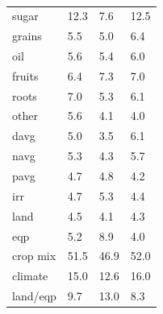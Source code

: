 \documentclass[11pt]{article}
\begin{document}
\begin{table}[h!]
{\begin{tabular}{llll}
sugar & 12.3 & 7.6 & 12.5 \\
grains & 5.5 & 5.0 & 6.4 \\
oil & 5.6 & 5.4 & 6.0 \\
fruits & 6.4 & 7.3 & 7.0 \\
roots & 7.0 & 5.3 & 6.1 \\
other & 5.6 & 4.1 & 4.0 \\
davg & 5.0 & 3.5 & 6.1 \\
navg & 5.3 & 4.3 & 5.7 \\
pavg & 4.7 & 4.8 & 4.2 \\
irr & 4.7 & 5.3 & 4.4 \\
land & 4.5 & 4.1 & 4.3 \\
eqp & 5.2 & 8.9 & 4.0 \\
\midrule
crop mix & 51.5 & 46.9 & 52.0 \\
climate & 15.0 & 12.6 & 16.0 \\
land/eqp & 9.7 & 13.0 & 8.3 \\
\bottomrule
\end{tabular}
\caption{ }
\label{t.wy.wt_percentages}
}
\end{table}
\end{document}
